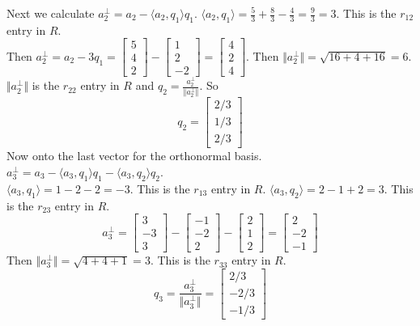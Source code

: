 \documentclass[11pt]{article}
\begin{document}
\noindent Next we calculate $a_2^{\perp}=a_2-\langle a_2,q_1\rangle q_1$. \quad $\langle a_2,q_1\rangle=\frac53+\frac83-\frac43 = \frac93=3$. This is the $r_{12}$ entry in $R$.\\
Then $a_2^{\perp} = a_2-3q_1=\begin{bmatrix}
    5\\4\\2
\end{bmatrix}-\begin{bmatrix}
    1\\2\\-2
\end{bmatrix}= \begin{bmatrix}
    4\\2\\4
\end{bmatrix}$. \quad Then $\Vert a_2^{\perp} \Vert = \sqrt{16+4+16} = 6$. $\Vert a_2^{\perp} \Vert$ is the $r_{22}$ entry in $R$ 
and $q_2 = \frac{a_2^{\perp}}{\Vert a_2^{\perp} \Vert}$. So
$$
q_2 = \begin{bmatrix}
    2/3\\1/3\\2/3
\end{bmatrix}
$$
\bigskip
Now onto the last vector for the orthonormal basis. $a_3^{\perp} = a_3-\langle a_3,q_1\rangle q_1-\langle a_3,q_2\rangle q_2$.\\
$\langle a_3,q_1\rangle = 1-2-2= -3$. This is the $r_{13}$ entry in $R$.
$\langle a_3,q_2\rangle = 2-1+2 = 3$. This is the $r_{23}$ entry in $R$.
$$
a_3^{\perp}=\begin{bmatrix}
    3\\-3\\3
\end{bmatrix}-\begin{bmatrix}
    -1\\-2\\2
\end{bmatrix}-\begin{bmatrix}
    2\\1\\2
\end{bmatrix}=\begin{bmatrix}
    2\\-2\\-1
\end{bmatrix}
$$
Then $\Vert a_3^{\perp} \Vert = \sqrt{4+4+1}= 3$. This is the $r_{33}$ entry in $R$.
$$
q_3 = \frac{a_3^{\perp}}{\Vert a_3^{\perp} \Vert} = \begin{bmatrix}
    2/3\\-2/3\\-1/3
\end{bmatrix}
$$
\end{document}
